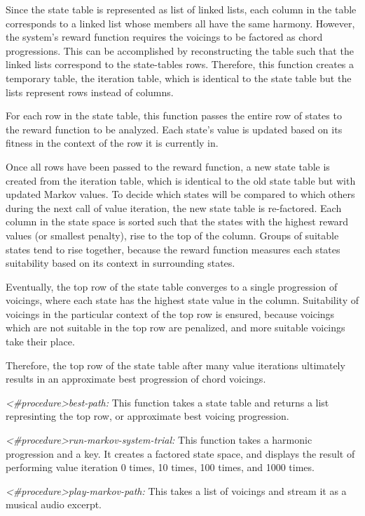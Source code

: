 \documentclass{chi2009}
\begin{document}
Since the state table is represented as list of linked lists, each column in the table corresponds to a linked list whose members all have the same harmony.  However, the system's reward function requires the voicings to be factored as chord progressions.  This can be accomplished by reconstructing the table such that the linked lists correspond to the state-tables rows.  Therefore, this function creates a temporary table, the iteration table, which is identical to the state table but the lists represent rows instead of columns.

For each row in the state table, this function passes the entire row of states to the reward function to be analyzed.  Each state's value is updated based on its fitness in the context of the row it is currently in.  

Once all rows have been passed to the reward function, a new state table is created from the iteration table, which is identical to the old state table but with updated Markov values.  To decide which states will be compared to which others during the next call of value iteration, the new state table is re-factored.  Each column in the state space is sorted such that the states with the highest reward values (or smallest penalty), rise to the top of the column.  Groups of suitable states tend to rise together, because the reward function measures each states suitability based on its context in surrounding states.  

Eventually, the top row of the state table converges to a single progression of voicings, where each state has the highest state value in the column.  Suitability of voicings in the particular context of the top row is ensured, because voicings which are not suitable in the top row are penalized, and more suitable voicings take their place.

Therefore, the top row of the state table after many value iterations ultimately results in an approximate best progression of chord voicings.


\textit{\textless\#procedure\textgreater best-path:} This function takes a state table and returns a list represinting the top row, or approximate best voicing progression.

\textit{\textless\#procedure\textgreater run-markov-system-trial:}  This function takes a harmonic progression and a key.  It creates a factored state space, and displays the result of performing value iteration 0 times, 10 times, 100 times, and 1000 times.

\textit{\textless\#procedure\textgreater play-markov-path:}  This takes a list of voicings and stream it as a musical audio excerpt.
\end{document}
